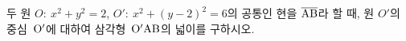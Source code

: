 두 원 $O:\ x^2+y^2=2$, $O':\ x^2+(y-2)^2=6$의 공통인 현을 $\overline{\mathrm{AB}}$라 할 때, 원 $O'$의 중심~$\mathrm{O'}$에 대하여 삼각형~$\mathrm{O'AB}$의 넓이를 구하시오.
